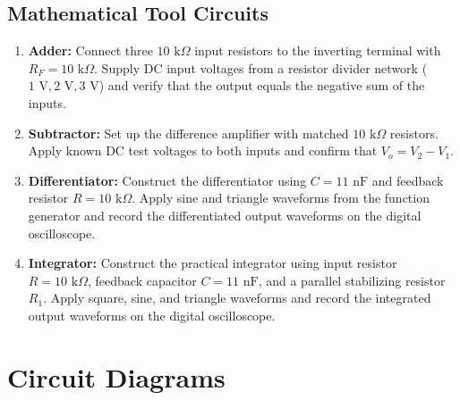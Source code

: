 \documentclass[12pt,a4paper]{article}
\begin{document}
\subsection{Mathematical Tool Circuits}
\begin{enumerate}
    \item \textbf{Adder:} Connect three $10\text{ k}\Omega$ input resistors to the inverting terminal with $R_F = 10\text{ k}\Omega$. Supply DC input voltages from a resistor divider network ($1\text{ V}, 2\text{ V}, 3\text{ V}$) and verify that the output equals the negative sum of the inputs.
    \item \textbf{Subtractor:} Set up the difference amplifier with matched $10\text{ k}\Omega$ resistors. Apply known DC test voltages to both inputs and confirm that $V_o = V_2 - V_1$.
    \item \textbf{Differentiator:} Construct the differentiator using $C = 11\text{ nF}$ and feedback resistor $R = 10\text{ k}\Omega$. Apply sine and triangle waveforms from the function generator and record the differentiated output waveforms on the digital oscilloscope.
    \item \textbf{Integrator:} Construct the practical integrator using input resistor $R = 10\text{ k}\Omega$, feedback capacitor $C = 11\text{ nF}$, and a parallel stabilizing resistor $R_1$. Apply square, sine, and triangle waveforms and record the integrated output waveforms on the digital oscilloscope.
\end{enumerate}

\section{Circuit Diagrams}
\end{document}
